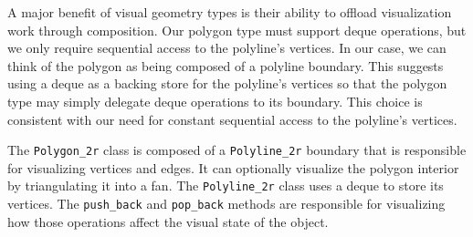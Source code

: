 A major benefit of visual geometry types is their ability to offload
visualization work through composition. Our polygon type must support deque
operations, but we only require sequential access to the polyline's vertices. In
our case, we can think of the polygon as being composed of a polyline boundary.
This suggests using a deque as a backing store for the polyline's vertices so
that the polygon type may simply delegate deque operations to its boundary. This
choice is consistent with our need for constant sequential access to the
polyline's vertices.

The \texttt{Polygon\_2r} class is composed of a \texttt{Polyline\_2r} boundary
that is responsible for visualizing vertices and edges. It can optionally
visualize the polygon interior by triangulating it into a fan. The
\texttt{Polyline\_2r} class uses a deque to store its vertices. The
\texttt{push\_back} and \texttt{pop\_back} methods are responsible for
visualizing how those operations affect the visual state of the object.

